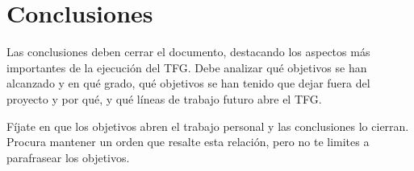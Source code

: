 \chapter{Conclusiones}
\label{ch:conclusiones}

\avisoLocalizacionArchivo 

Las conclusiones deben cerrar el documento, destacando los aspectos más importantes de la ejecución del TFG.  Debe analizar qué objetivos se han alcanzado y en qué grado, qué objetivos se han tenido que dejar fuera del proyecto y por qué, y qué líneas de trabajo futuro abre el TFG. 

Fíjate en que los objetivos abren el trabajo personal y las conclusiones lo cierran.  Procura mantener un orden que resalte esta relación, pero no te limites a parafrasear los objetivos.